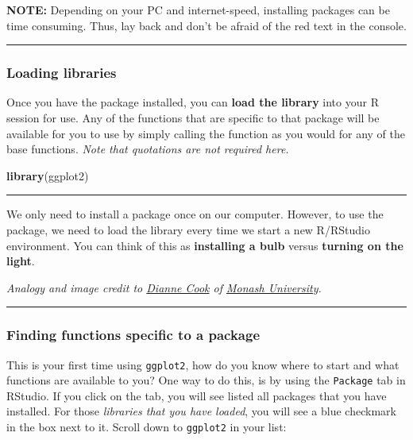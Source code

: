 \documentclass[
]{article}
\newenvironment{Shaded}{\begin{snugshade}}{\end{snugshade}}
\newcommand{\KeywordTok}[1]{\textcolor[rgb]{0.13,0.29,0.53}{\textbf{#1}}}
\newcommand{\NormalTok}[1]{#1}
\begin{document}
\textbf{NOTE:} Depending on your PC and internet-speed, installing
packages can be time consuming. Thus, lay back and don't be afraid of
the {red text} in the console.

\begin{center}\rule{0.5\linewidth}{0.5pt}\end{center}

\hypertarget{loading-libraries}{%
\subsubsection{Loading libraries}\label{loading-libraries}}

Once you have the package installed, you can \textbf{load the library}
into your R session for use. Any of the functions that are specific to
that package will be available for you to use by simply calling the
function as you would for any of the base functions. \emph{Note that
quotations are not required here.}

\begin{Shaded}
\begin{Highlighting}[]
\KeywordTok{library}\NormalTok{(ggplot2)}
\end{Highlighting}
\end{Shaded}

\begin{center}\rule{0.5\linewidth}{0.5pt}\end{center}

We only need to install a package once on our computer. However, to use
the package, we need to load the library every time we start a new
R/RStudio environment. You can think of this as \textbf{installing a
bulb} versus \textbf{turning on the light}.

\emph{Analogy and image credit to
\href{https://twitter.com/visnut/status/1248087845589274624}{Dianne
Cook} of \href{https://www.monash.edu/}{Monash University}.}

\begin{center}\rule{0.5\linewidth}{0.5pt}\end{center}

\hypertarget{finding-functions-specific-to-a-package}{%
\subsubsection{Finding functions specific to a
package}\label{finding-functions-specific-to-a-package}}

This is your first time using \texttt{ggplot2}, how do you know where to
start and what functions are available to you? One way to do this, is by
using the \texttt{Package} tab in RStudio. If you click on the tab, you
will see listed all packages that you have installed. For those
\emph{libraries that you have loaded}, you will see a blue checkmark in
the box next to it. Scroll down to \texttt{ggplot2} in your list:
\end{document}
